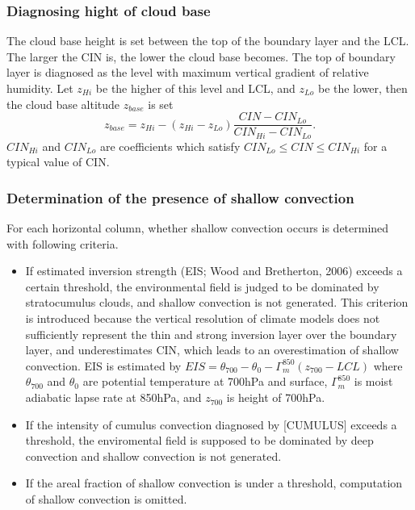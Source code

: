 \documentclass[platex, dvipdfmx]{article}
\begin{document}
\subsubsection{Diagnosing hight of cloud base}\label{diagno-height-of-cloud-base}
The cloud base height is set between the top of the boundary layer and the LCL. The larger the CIN is, the lower the cloud base becomes.
The top of boundary layer is diagnosed as the level with maximum vertical gradient of relative humidity. 
Let $z_{Hi}$ be the higher of this level and LCL, and $z_{Lo}$ be the lower, then the cloud base altitude $z_{base}$ is set
\begin{equation}\label{zbase}
    z_{base} = z_{Hi} - (z_{Hi}-z_{Lo})\frac{CIN-CIN_{Lo}}{CIN_{Hi} - CIN_{Lo}}.
\end{equation}
$CIN_{Hi}$ and $CIN_{Lo}$ are coefficients which satisfy $CIN_{Lo}\le CIN \le CIN_{Hi}$ for a typical value of CIN.

\subsubsection{Determination of the presence of shallow convection}\label{presence-of-shallow-convection}
For each horizontal column, whether shallow convection occurs is determined with following criteria.
\begin{itemize}
    \item If estimated inversion strength (EIS; Wood and Bretherton, 2006) exceeds a certain threshold,
    the environmental field is judged to be dominated by stratocumulus clouds, and shallow convection is not generated.
    This criterion is introduced because the vertical resolution of climate models does not sufficiently represent the thin and strong inversion layer over the boundary layer,
    and underestimates CIN, which leads to an overestimation of shallow convection.
    EIS is estimated by
     $EIS=\theta_{700}-\theta_{0}-\Gamma_m^{850}(z_{700}-LCL)$
    where $\theta_{700}$ and $\theta_0$ are potential temperature at 700hPa and surface, $\Gamma_m^{850}$ is moist adiabatic lapse rate at 850hPa, 
    and $z_{700}$ is height of 700hPa.
   \item If the intensity of cumulus convection diagnosed by [CUMULUS] exceeds a threshold, the enviromental field is supposed to be dominated by deep convection and shallow convection is not generated.
   \item If the areal fraction of shallow convection is under a threshold, computation of shallow convection is omitted.
 \end{itemize}
\end{document}
